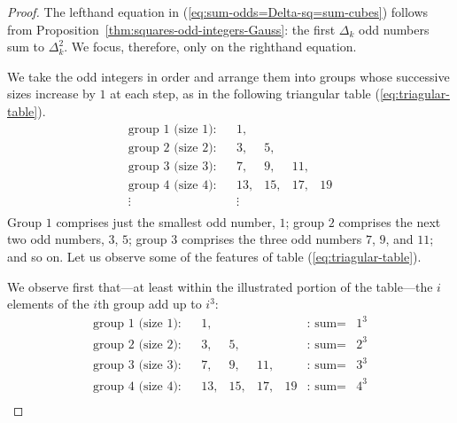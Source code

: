 \begin{proof}
The lefthand equation in (\ref{eq:sum-odds=Delta-sq=sum-cubes}) follows from 
Proposition~\ref{thm:squares-odd-integers-Gauss}: the first $\Delta_k$ odd numbers sum
to $\Delta_k^2$.  We focus, therefore, only on the righthand equation.

\medskip

We take the odd integers in order and arrange them into groups whose successive sizes increase by $1$ at each step, as in the following triangular table (\ref{eq:triagular-table}).
\begin{equation}
\label{eq:triagular-table}
\begin{array}{llrrrrclcc}
\mbox{group $1$ (size $1$):} & &
1,  &    &     &      \\
\mbox{group $2$ (size $2$):} & &
3,  &  5, &     &      \\
\mbox{group $3$ (size $3$):} & &
7,  &  9, & 11, &     \\
\mbox{group $4$ (size $4$):} & &
13, & 15, & 17, & 19   \\
\vdots & & \vdots \\
\end{array}
\end{equation}
Group $1$ comprises just the smallest odd number, $1$; group $2$ comprises the next two odd numbers, $3$, $5$; group $3$ comprises the three odd numbers $7$,  $9$,  and $11$; and so on.  Let us observe some of the features of table (\ref{eq:triagular-table}).

We observe first that---at least within the illustrated portion of the table---the $i$ elements of the $i$th group add up to $i^3$:
\[
\begin{array}{llrrrrclcc}
\mbox{group $1$ (size $1$):} & &
1,  &    &     &     & \mbox{: sum} = &  1^3 \\
\mbox{group $2$ (size $2$):} & &
3,  &  5, &     &    & \mbox{: sum} =  &  2^3 \\
\mbox{group $3$ (size $3$):} & &
7,  &  9, & 11, &    &  \mbox{: sum} = &  3^3 \\
\mbox{group $4$ (size $4$):} & &
13, & 15, & 17, & 19 & \mbox{: sum} =  &  4^3 \\
\end{array}
\]


\end{proof}
